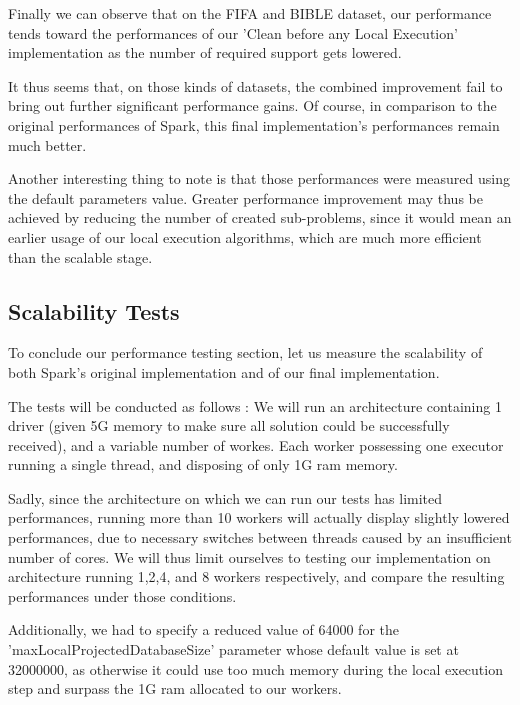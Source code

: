 \documentclass{eplmastersthesis}
\begin{document}
Finally we can observe that on the FIFA and BIBLE dataset, our performance tends toward the performances of our 'Clean before any Local Execution' implementation as the number of required support gets lowered. \newline

It thus seems that, on those kinds of datasets, the combined improvement fail to bring out further significant performance gains.
Of course, in comparison to the original performances of Spark, this final implementation's performances remain much better. \newline

Another interesting thing to note is that those performances were measured using the default parameters value. Greater performance improvement may thus be achieved by reducing the number of created sub-problems, since it would mean an earlier usage of our local execution algorithms, which are much more efficient than the scalable stage. \newline

\subsection{Scalability Tests}

To conclude our performance testing section, let us measure the scalability of both Spark's original implementation and of our final implementation. \newline

The tests will be conducted as follows : We will run an architecture containing 1 driver (given 5G memory to make sure all solution could be successfully received), and a variable number of workes. Each worker possessing one executor running a single thread, and disposing of only 1G ram memory. \newline

Sadly, since the architecture on which we can run our tests has limited performances, running more than 10 workers will actually display slightly lowered performances, due to necessary switches between threads caused by an insufficient number of cores. We will thus limit ourselves to testing our implementation on architecture running 1,2,4, and 8 workers respectively, and compare the resulting performances under those conditions. \newline

Additionally, we had to specify a reduced value of 64000 for the 'maxLocalProjectedDatabaseSize' parameter whose default value is set at 32000000, as otherwise it could use too much memory during the local execution step and surpass the 1G ram allocated to our workers.
\end{document}
